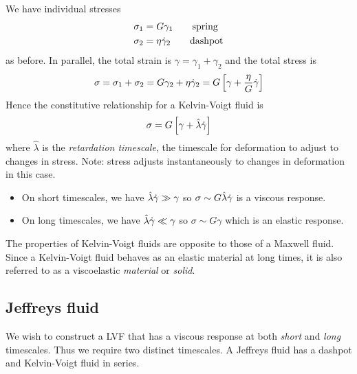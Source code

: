 \documentclass{jknotes}
\begin{document}
We have individual stresses
\begin{align}
	\sigma_1 &= G \gamma_1 \hspace{2em} \text{spring}\\
	\sigma_2 &= \eta \dot{\gamma}_2 \hspace{2em} \text{dashpot} \\
\end{align}
as before. In parallel, the total strain is $\gamma = \gamma_1 + \gamma_2$ and
the total stress is
\begin{equation}
	\sigma = \sigma_1 + \sigma_2 = G\gamma_2 + \eta \dot{\gamma}_2 = G\left[ \gamma
	+ \frac{\eta}{G} \dot{\gamma}\right]
\end{equation}
Hence the constitutive relationship for a Kelvin-Voigt fluid is
\begin{equation}
	\sigma = G \left[ \gamma + \hat{\lambda}\dot{\gamma}\right]
\end{equation}
where $\hat{\lambda}$ is the \emph{retardation timescale}, the timescale for
deformation to adjust to changes in stress. Note: stress adjusts
instantaneously to changes in deformation in this case.
\begin{itemize}
	\item On short timescales, we have $\hat{\lambda} \dot{\gamma} \gg \gamma$ so $\sigma
		\sim G \hat{\lambda} \dot{\gamma}$ is a viscous response.
	\item On long timescales, we have $\hat{\lambda} \dot{\gamma} \ll \gamma$ so
		$\sigma \sim G \gamma$ which is an elastic response.
\end{itemize}

The properties of Kelvin-Voigt fluids are opposite to those of a Maxwell
fluid. Since a Kelvin-Voigt fluid behaves as an elastic material at long
times, it is also referred to as a viscoelastic \emph{material} or
\emph{solid}.

\subsection{Jeffreys fluid}
We wish to construct a LVF that has a viscous response at both \emph{short}
and \emph{long} timescales. Thus we require two distinct timescales. A
Jeffreys fluid has a dashpot and Kelvin-Voigt fluid in series.
\end{document}
